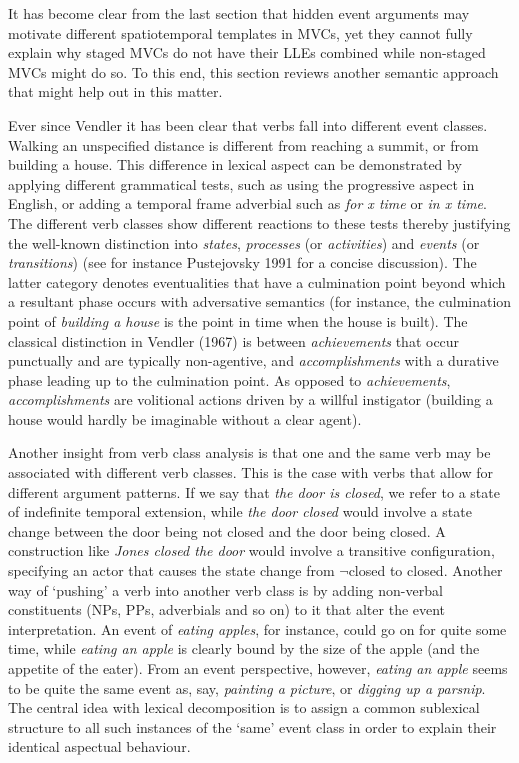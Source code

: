 It has become clear from the last section that hidden event arguments may motivate different spatiotemporal templates in MVCs, yet they cannot fully explain why staged MVCs do not have their LLEs combined while non-staged MVCs might do so. To this end, this section reviews another semantic approach that might help out in this matter.

Ever since Vendler it has been clear that verbs fall into different event classes. Walking an unspecified distance is different from reaching a summit, or from building a house. This difference in lexical aspect can be demonstrated by applying different grammatical tests, such as using the progressive aspect in English, or adding a temporal frame adverbial such as \textit{for x time} or \textit{in x time}. The different verb classes show different reactions to these tests thereby justifying the well-known distinction into \textit{states}, \textit{processes} (or \textit{activities}) and \textit{events} (or \textit{transitions}) (see for instance Pustejovsky 1991 for a concise discussion). The latter category denotes eventualities that have a culmination point beyond which a resultant phase occurs with adversative semantics (for instance, the culmination point of \textit{building a house} is the point in time when the house is built). The classical distinction in Vendler (1967) is between \textit{achievements} that occur punctually and are typically non-agentive, and \textit{accomplishments} with a durative phase leading up to the culmination point. As opposed to \textit{achievements}, \textit{accomplishments} are volitional actions driven by a willful instigator (building a house would hardly be imaginable without a clear agent).

Another insight from verb class analysis is that one and the same verb may be associated with different verb classes. This is the case with verbs that allow for different argument patterns. If we say that \textit{the door is closed}, we refer to a state of indefinite temporal extension, while \textit{the door closed} would involve a state change between the door being not closed and the door being closed. A construction like \textit{Jones closed the door} would involve a transitive configuration, specifying an actor that causes the state change from $\neg$closed to closed. Another way of `pushing' a verb into another verb class is by adding non-verbal constituents (NPs, PPs, adverbials and so on) to it that alter the event interpretation. An event of \textit{eating apples}, for instance, could go on for quite some time, while \textit{eating an apple} is clearly bound by the size of the apple (and the appetite of the eater). From an event perspective, however, \textit{eating an apple} seems to be quite the same event as, say, \textit{painting a picture}, or \textit{digging up a parsnip}. The central idea with lexical decomposition is to assign a common sublexical structure to all such instances of the `same' event class in order to explain their identical aspectual behaviour.

